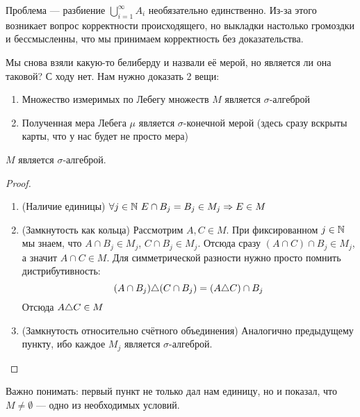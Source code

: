 \begin{note}
	Проблема --- разбиение $\bigcup_{i = 1}^\infty A_i$ необязательно единственно. Из-за этого возникает вопрос корректности происходящего, но выкладки настолько громоздки и бессмысленны, что мы принимаем корректность без доказательства.
\end{note}

\begin{note}
	Мы снова взяли какую-то белиберду и назвали её мерой, но является ли она таковой? С ходу нет. Нам нужно доказать 2 вещи:
	\begin{enumerate}
		\item Множество измеримых по Лебегу множеств $M$ является $\sigma$-алгеброй
		
		\item Полученная мера Лебега $\mu$ является $\sigma$-конечной мерой (здесь сразу вскрыты карты, что у нас будет не просто мера)
	\end{enumerate}
\end{note}

\begin{theorem}
	$M$ является $\sigma$-алгеброй.
\end{theorem}

\begin{proof}~
	\begin{enumerate}
		\item (Наличие единицы) $\forall j \in \mathbb{N}\ E \cap B_j = B_j \in M_j \Rightarrow E \in M$
		
		\item (Замкнутость как кольца) Рассмотрим $A, C \in M$. При фиксированном $j \in \mathbb{N}$ мы знаем, что $A \cap B_j \in M_j$, $C \cap B_j \in M_j$. Отсюда сразу $(A \cap C) \cap B_j \in M_j$, а значит $A \cap C \in M$. Для симметрической разности нужно просто помнить дистрибутивность:
		\[
			(A \cap B_j) \triangle (C \cap B_j) = (A \triangle C) \cap B_j
		\]
		Отсюда $A \triangle C \in M$
		
		\item (Замкнутость относительно счётного объединения) Аналогично предыдущему пункту, ибо каждое $M_j$ является $\sigma$-алгеброй.
	\end{enumerate}
\end{proof}

\begin{note}
	Важно понимать: первый пункт не только дал нам единицу, но и показал, что $M \neq \emptyset$ --- одно из необходимых условий.
\end{note}

